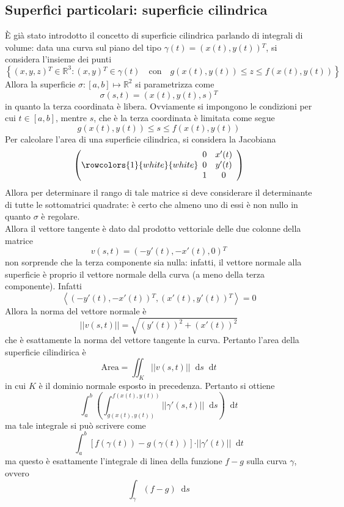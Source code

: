 \documentclass[a4paper]{extarticle}
\newcommand*\dif{\mathop{}\!\mathrm{d}}
\begin{document}
\subsection{Superfici particolari: superficie cilindrica}
È già stato introdotto il concetto di superficie cilindrica parlando di integrali di volume: data una curva sul piano del tipo $\gamma(t)=(x(t),y(t)){^T}$, si considera l'insieme dei punti
\[\left\{(x,y,z){^T} \in \mathbb{R}^3 : (x,y){^T} \in \gamma(t) \hspace{1em} \text{con} \hspace{1em} g(x(t),y(t)) \leq z \leq f(x(t),y(t))\right\}\]
Allora la superficie $\sigma : [a,b] \longmapsto \mathbb{R}^2$ si parametrizza come
\[\sigma(s,t) = (x(t),y(t),s){^T}\]
in quanto la terza coordinata è libera. Ovviamente si impongono le condizioni per cui $t \in [a,b]$, mentre $s$, che è la terza coordinata è limitata come segue
\[g(x(t),y(t)) \leq s \leq f(x(t),y(t))\]
Per calcolare l'area di una superficie cilindrica, si considera la Jacobiana
\[
    \left(
        \rowcolors{1}{white}{white}
        \begin{array}{cc}
            0 & x'(t)\\
            0 & y'(t)\\
            1 & 0\\
        \end{array}
    \right)
\]
Allora per determinare il rango di tale matrice si deve considerare il determinante di tutte le sottomatrici quadrate: è certo che almeno uno di essi è non nullo in quanto $\sigma$ è regolare.\\
Allora il vettore tangente è dato dal prodotto vettoriale delle due colonne della matrice
\[v(s,t)=(-y'(t),-x'(t),0){^T}\]
non sorprende che la terza componente sia nulla: infatti, il vettore normale alla superficie è proprio il vettore normale della curva (a meno della terza componente). Infatti
\[\left<(-y'(t),-x'(t)){^T},(x'(t),y'(t)){^T}\right>=0\]
Allora la norma del vettore normale è
\[\vert \vert v(s,t) \vert \vert = \sqrt{(y'(t))^2 + (x'(t))^2}\]
che è esattamente la norma del vettore tangente la curva. Pertanto l'area della superficie cilindirica è
\[\text{Area}=\iint_K \vert\vert v(s,t) \vert \vert \dif s \dif t\]
in cui $K$ è il dominio normale esposto in precedenza. Pertanto si ottiene
\[\int_a^b \left(\int_{g(x(t),y(t))}^{f(x(t),y(t))} \vert \vert \gamma'(s,t) \vert \vert\dif s\right)\dif t\]
ma tale integrale si può scrivere come
\[\int_a^b \left[f(\gamma(t)) - g(\gamma(t))\right] \cdot \vert \vert \gamma'(t) \vert \vert \dif t\]
ma questo è esattamente l'integrale di linea della funzione $f-g$ sulla curva $\gamma$, ovvero
\[\int_\gamma (f-g) \dif s\]
\end{document}
